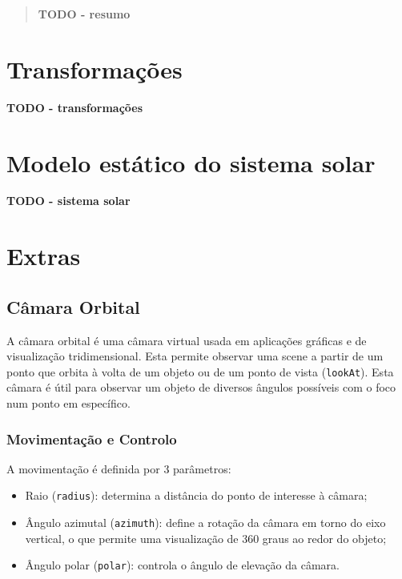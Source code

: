 \documentclass[12pt, a4paper]{article}
\begin{document}
\pagebreak

\begin{abstract}
    \textbf{\color{red} TODO - resumo}
\end{abstract}

\section{Transformações}

\textbf{\color{red} TODO - transformações}

\section{Modelo estático do sistema solar}

\textbf{\color{red} TODO - sistema solar}

\section{Extras}

\subsection{Câmara Orbital}

A câmara orbital é uma câmara virtual usada em aplicações gráficas e de visualização tridimensional.
Esta permite observar uma scene a partir de um ponto que orbita à volta de um objeto ou de
um ponto de vista (\texttt{lookAt}). Esta câmara é útil para observar
um objeto de diversos ângulos possíveis com o foco num ponto em específico.

\subsubsection{Movimentação e Controlo}

A movimentação é definida por 3 parâmetros:
\begin{itemize}
    \item Raio (\texttt{radius}): determina a distância do ponto de interesse à câmara;
    \item Ângulo azimutal (\texttt{azimuth}): define a rotação da câmara em torno do eixo vertical,
    o que permite uma visualização de 360 graus ao redor do objeto;
    \item Ângulo polar (\texttt{polar}): controla o ângulo de elevação da câmara.
\end{itemize}
\end{document}

